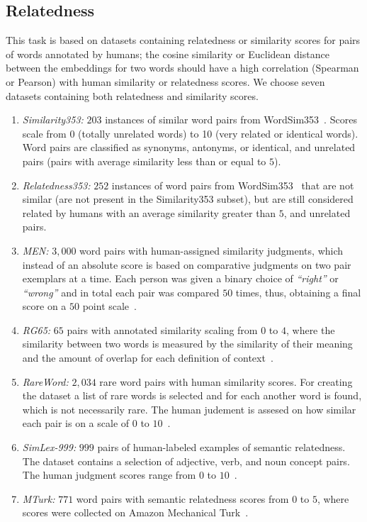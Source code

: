  \subsection{Relatedness}
This task is based on datasets containing relatedness or similarity scores for pairs of words annotated by humans; the cosine similarity or Euclidean distance between the embeddings for two words should have a high correlation (Spearman or Pearson) with human similarity or relatedness scores. We choose seven datasets containing both relatedness and similarity scores. 
\begin{enumerate}
 \item \emph{Similarity353:} $203$ instances of similar word pairs from WordSim353~. Scores scale from 0 (totally unrelated words) to 10 (very related or identical words). Word pairs are classified as synonyms, antonyms, or identical, and unrelated pairs (pairs with average similarity less than or equal to $5$).
 \item \emph{Relatedness353:} $252$ instances of word pairs from WordSim353~ that are not similar (are not present in the Similarity353 subset), but are still considered related by humans with an average similarity greater than $5$, and unrelated pairs.
 \item \emph{MEN:} $3,000$ word pairs with human-assigned similarity judgments, which instead of an absolute score is based on comparative judgments on two pair exemplars at a time. Each person was given a binary choice of \emph{``right''} or \emph{``wrong''} and in total each pair was compared $50$ times, thus, obtaining a final score on a $50$ point scale~.
 \item \emph{RG65:} $65$ pairs with annotated similarity scaling from $0$ to $4$, where the similarity between two words is measured by the similarity of their meaning and the amount of overlap for each definition of context~.
 \item \emph{RareWord:} $2,034$ rare word pairs with human similarity scores. For creating the dataset a list of rare words is selected and for each another word is found, which is not necessarily rare. The human judement is assesed on how similar each pair is on a scale of $0$ to $10$~.
 \item \emph{SimLex-999:} $999$ pairs of human-labeled examples of semantic relatedness. The dataset contains a selection of adjective, verb, and noun concept pairs. The human judgment scores range from $0$ to $10$~.
 \item \emph{MTurk:} $771$ word pairs with semantic relatedness scores from
$0$ to $5$, where scores were collected on Amazon Mechanical Turk~.
\end{enumerate}
